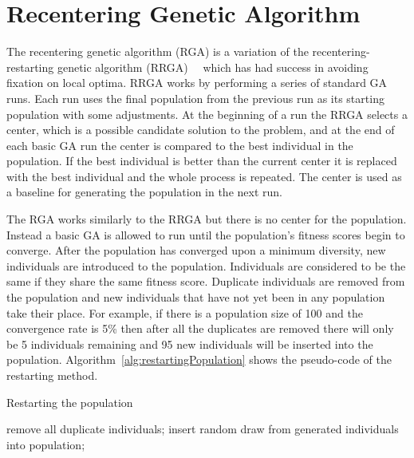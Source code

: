 \section{Recentering Genetic Algorithm}
\label{sec:rga}

The recentering genetic algorithm (RGA) is a variation of the recentering-restarting genetic algorithm (RRGA)~\cite{hughes2013recentering}~\cite{hughes2013edit} which has had success in avoiding fixation on local optima. RRGA works by performing a series of standard GA runs. Each run uses the final population from the previous run as its starting population with some adjustments. At the beginning of a run the RRGA selects a center, which is a possible candidate solution to the problem, and at the end of each basic GA run the center is compared to the best individual in the population. If the best individual is better than the current center it is replaced with the best individual and the whole process is repeated. The center is used as a baseline for generating the population in the next run.

The RGA works similarly to the RRGA but there is no center for the population. Instead a basic GA is allowed to run until the population's fitness scores begin to converge. After the population has converged upon a minimum diversity, new individuals are introduced to the population. Individuals are considered to be the same if they share the same fitness score. Duplicate individuals are removed from the population and new individuals that have not yet been in any population take their place. For example, if there is a population size of 100 and the convergence rate is 5\% then after all the duplicates are removed there will only be 5 individuals remaining and 95 new individuals will be inserted into the population. Algorithm~\ref{alg:restartingPopulation} shows the pseudo-code of the restarting method.

\begin{algorithm}[H]
\caption{Restarting the population}
\label{alg:restartingPopulation}
\begin{algorithmic}

  \STATE remove all duplicate individuals;
    \STATE insert random draw from generated individuals into population;
  \ENDWHILE
\ENDIF

\end{algorithmic}
\end{algorithm}